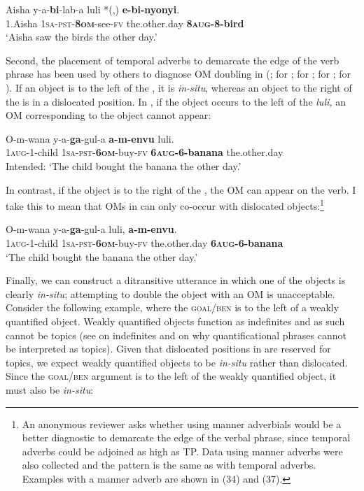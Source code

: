 \documentclass[output=paper,newtxmath,modfonts,nonflat,hidelinks]{langsci/langscibook}
\begin{document}
\ea\label{ex:ranero:10}
\gll Aisha    y-a-\textbf{bi}{}-lab-a        luli           *(,) \textbf{e-bi-nyonyi}.\\
1.Aisha \textsc{1sa-pst-}\textbf{\textsc{8om}}{}-see-\textsc{fv} the.other.day   {}  \textbf{8\textsc{aug}}\textbf{{}-8-bird}\\
\glt ‘Aisha saw the birds the other day.’
\z

Second, the placement of temporal adverbs to demarcate the edge of the verb phrase has been used by others to diagnose OM doubling in  (\citealt{Henderson2006}; \citealt{Riedel2009} for ; \citealt{bax2012} for ; \citealt{dierckstoappear} for ; \citealt{zeller2009,Zeller2015} for ). If an object is to the left of the , it is \textit{in-situ}, whereas an object to the right of the  is in a dislocated position. In , if the object occurs to the left of the  \textit{luli,} an OM corresponding to the object cannot appear:

\ea\label{ex:ranero:11}
\gll *O-m-wana    y-a-\textbf{ga}{}-gul-a               \textbf{a-m-envu}           luli.\\
1\textsc{aug}{}-1-child \textsc{1sa-pst-}\textbf{\textsc{6om}}{}-buy-\textsc{fv} \textbf{6\textsc{aug}}\textbf{{}-6-banana} the.other.day\\
\glt Intended: ‘The child bought the banana the other day.’
\z

In contrast, if the object is to the right of the , the OM can appear on the verb. I take this to mean that OMs in  can only co-occur with dislocated objects:\footnote{An anonymous reviewer asks whether using manner adverbials would be a better diagnostic to demarcate the edge of the verbal phrase, since temporal adverbs could be adjoined as high as TP. Data using manner adverbs were also collected and the pattern is the same as with temporal adverbs. Examples with a manner adverb are shown in (34) and (37).} 

\ea\label{ex:ranero:12}
\gll O-m-wana     y-a-\textbf{ga}{}-gul-a         luli,           \textbf{a-m-envu}.\\
1\textsc{aug}{}-1-child  \textsc{1sa-pst}{}-\textbf{\textsc{6om}}\textsc{{}-}buy-\textsc{fv}  the.other.day  \textbf{6\textsc{aug}}\textbf{{}-6-banana}\\
\glt ‘The child bought the banana the other day.’
\z

Finally, we can construct a ditransitive utterance in which one of the objects is clearly \textit{in-situ}; attempting to double the object with an OM is unacceptable. Consider the following example, where the \textsc{goal/ben} is to the left of a weakly quantified object. Weakly quantified objects function as indefinites and as such cannot be topics (see \citealt{Diesing1992} on indefinites and \citealt{Reinhart1981} on why quantificational phrases cannot be interpreted as topics). Given that dislocated positions in  are reserved for topics, we expect weakly quantified objects to be \textit{in-situ} rather than dislocated. Since the \textsc{goal/ben} argument is to the left of the weakly quantified object, it must also be \textit{in-situ}:
\end{document}
